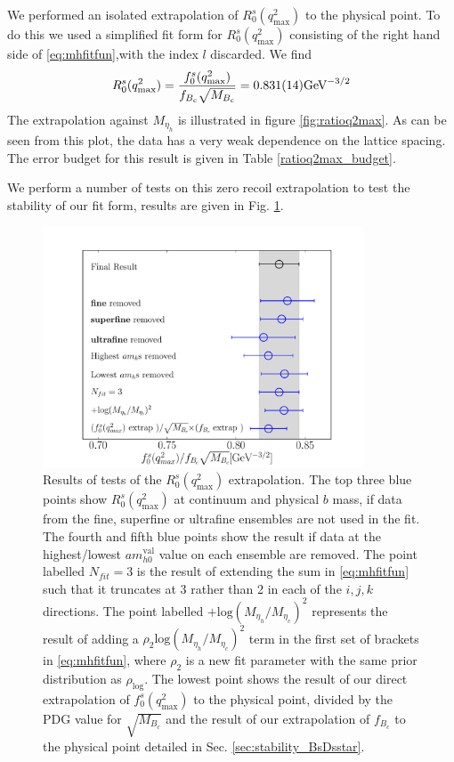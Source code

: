 We performed an isolated extrapolation of $R^s_0(q^2_{\text{max}})$ to the physical point. To do this we used a simplified fit form for $R^s_0(q^2_{\text{max}})$ consisting of the right hand side of \eqref{eq:mhfitfun},with the index $l$ discarded. We find
\begin{align}
  R_0^s(q^2_{\text{max}}) = {f_0^s(q^2_{\text{max}})\over f_{B_c}\sqrt{M_{B_c}}} = 0.831(14) \text{GeV}^{-3/2}
\end{align}
The extrapolation against $M_{\eta_h}$ is illustrated in figure \ref{fig:ratioq2max}. As can be seen from this plot, the data has a very weak dependence on the lattice spacing. The error budget for this result is given in Table \ref{ratioq2max_budget}.

We perform a number of tests on this zero recoil extrapolation to test the stability of our fit form, results are given in Fig. \ref{fig:ratiotests}.

\begin{figure}[htb!]
  \begin{center}
  \hspace{-20pt}
  \includegraphics[width=0.85\textwidth]{images/BsDs/ratio/f0dcq2max_stability.pdf}
  \caption{ Results of tests of the $R_0^s(q^2_{\text{max}})$ extrapolation. The top three blue points show $R_0^s(q^2_{\text{max}})$ at continuum and physical $b$ mass, if data from the fine, superfine or ultrafine ensembles are not used in the fit. The fourth and fifth blue points show the result if data at the highest/lowest $am_{h0}^{\text{val}}$ value on each ensemble are removed. The point labelled $N_{fit}=3$ is the result of extending the sum in \eqref{eq:mhfitfun} such that it truncates at 3 rather than 2 in each of the $i,j,k$ directions. The point labelled $+\text{log}(M_{\eta_h}/M_{\eta_c})^2$ represents the result of adding a $\rho_{2} \text{log}(M_{\eta_h}/M_{\eta_c})^2$ term in the first set of brackets in \eqref{eq:mhfitfun}, where $\rho_{2}$ is a new fit parameter with the same prior distribution as $\rho_{\text{log}}$. The lowest point shows the result of our direct extrapolation of $f_0^s(q^2_{\text{max}})$ to the physical point, divided by the PDG value for $\sqrt{M_{B_c}}$ \cite{PhysRevD.98.030001} and the result of our extrapolation of $f_{B_c}$ to the physical point detailed in Sec. \ref{sec:stability_BsDsstar}.
    \label{fig:ratiotests}}
  \end{center}
\end{figure}

